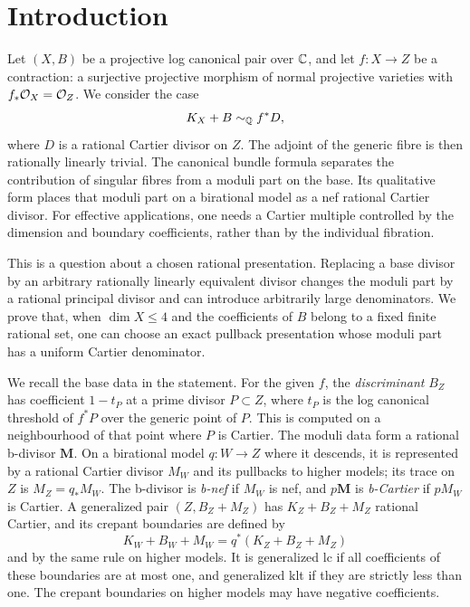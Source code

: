 \section{Introduction}\label{sec:introduction}

Let $(X,B)$ be a projective log canonical pair over $\mathbb C$, and let
$f:X\to Z$ be a contraction: a surjective projective morphism of normal
projective varieties with $f_*\mathcal O_X=\mathcal O_Z$.  We consider the case
\[
 K_X+B\sim_\mathbb Q f^*D,
\]
where $D$ is a rational Cartier divisor on $Z$.  The adjoint of the
generic fibre is then rationally linearly trivial.  The canonical bundle
formula separates the contribution of singular fibres from a moduli
part on the base.  Its qualitative form places that moduli part on a
birational model as a nef rational Cartier divisor.  For effective
applications, one needs a Cartier multiple controlled by the dimension
and boundary coefficients, rather than by the individual fibration.

This is a question about a chosen rational presentation.  Replacing a
base divisor by an arbitrary rationally linearly equivalent divisor
changes the moduli part by a rational principal divisor and can introduce
arbitrarily large denominators.  We prove that, when $\dim X\leq4$ and the
coefficients of $B$ belong to a fixed finite rational set, one can choose
an exact pullback presentation whose moduli part has a uniform Cartier denominator.

We recall the base data in the statement.  For the given $f$, the
\emph{discriminant} $B_Z$ has coefficient $1-t_P$ at a prime divisor
$P\subset Z$, where $t_P$ is the log canonical threshold of $f^*P$ over
the generic point of $P$.  This is computed on a neighbourhood of that
point where $P$ is Cartier.  The moduli data form a rational b-divisor
$\mathbf M$.  On a birational model $q:W\to Z$ where it descends, it is
represented by a rational Cartier divisor $M_W$ and its pullbacks to
higher models; its trace on $Z$ is $M_Z=q_*M_W$.  The b-divisor is
\emph{b-nef} if $M_W$ is nef, and $p\mathbf M$ is \emph{b-Cartier} if
$pM_W$ is Cartier.  A generalized pair $(Z,B_Z+M_Z)$ has
$K_Z+B_Z+M_Z$ rational Cartier, and its crepant boundaries are defined by
\[
 K_W+B_W+M_W=q^*(K_Z+B_Z+M_Z)
\]
and by the same rule on higher models.  It is generalized lc if all
coefficients of these boundaries are at most one, and generalized klt
if they are strictly less than one.  The crepant boundaries on higher
models may have negative coefficients.


